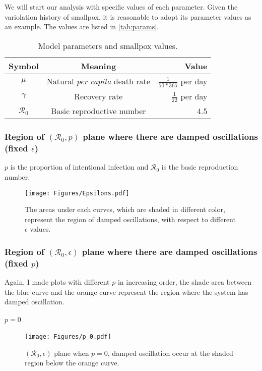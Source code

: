 \documentclass[12pt]{article}
\newcommand{\R}{\mathcal{R}}
\begin{document}
We will start our analysis with specific values of each parameter. Given the variolation history of smallpox, it is reasonable to adopt its parameter values as an example. The values are listed in \autoref{tab:params}.

\begin{table}[H]
\begin{center}
\caption{Model parameters and smallpox values.}
\label{tab:params}
\smallskip
\begin{tabular}{c|c|r}
{\bfseries Symbol} & {\bfseries Meaning} & {\bfseries Value} \\\hline
$\mu$ & Natural \emph{per capita} death rate & $\frac{1}{50*365}$ per day \\
$\gamma$ & Recovery rate & $\frac{1}{22}$ per day \\
$\R_0$ & Basic reproductive number & 4.5
\end{tabular}
\end{center}
\end{table}

\subsubsection{Region of $(\R_0,p)$ plane where there are damped
  oscillations (fixed $\epsilon$)}

$p$ is the proportion of intentional infection and $\R_0$ is the basic reproduction number.

\begin{figure}[H]
  \centering
  \texttt{[image: Figures/Epsilons.pdf]}
  \caption{The areas under each curves, which are shaded in different color, represent the region of damped oscillations, with respect to different $\epsilon$ values.}
\end{figure}

\subsubsection{Region of $(\R_0,\epsilon)$ plane where there are damped
  oscillations (fixed $p$)}

Again, I made plots with different $p$ in increasing order, the shade area between the blue curve and the orange curve represent the region where the system has damped oscillation.
\paragraph{$p=0$}
\begin{figure}[H]
  \centering
  \texttt{[image: Figures/p\_0.pdf]}
  \caption{$(\R_0,\epsilon)$ plane when $p=0$, damped oscillation occur at the shaded region below the orange curve.}
\end{figure}
\end{document}
